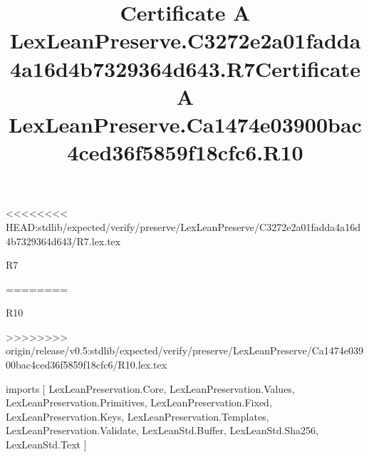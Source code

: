 <<<<<<<< HEAD:stdlib/expected/verify/preserve/LexLeanPreserve/C3272e2a01fadda4a16d4b7329364d643/R7.lex.tex
\begin{lexlean}{R7}
\title{Certificate A LexLeanPreserve.C3272e2a01fadda4a16d4b7329364d643.R7}
========
\begin{lexlean}{R10}
\title{Certificate A LexLeanPreserve.Ca1474e03900bac4ced36f5859f18cfc6.R10}
>>>>>>>> origin/release/v0.5:stdlib/expected/verify/preserve/LexLeanPreserve/Ca1474e03900bac4ced36f5859f18cfc6/R10.lex.tex
\begin{coremodule}
imports [
  LexLeanPreservation.Core,
  LexLeanPreservation.Values,
  LexLeanPreservation.Primitives,
  LexLeanPreservation.Fixed,
  LexLeanPreservation.Keys,
  LexLeanPreservation.Templates,
  LexLeanPreservation.Validate,
  LexLeanStd.Buffer,
  LexLeanStd.Sha256,
  LexLeanStd.Text
]


\end{coremodule}
\end{lexlean}
\end{lexlean}

